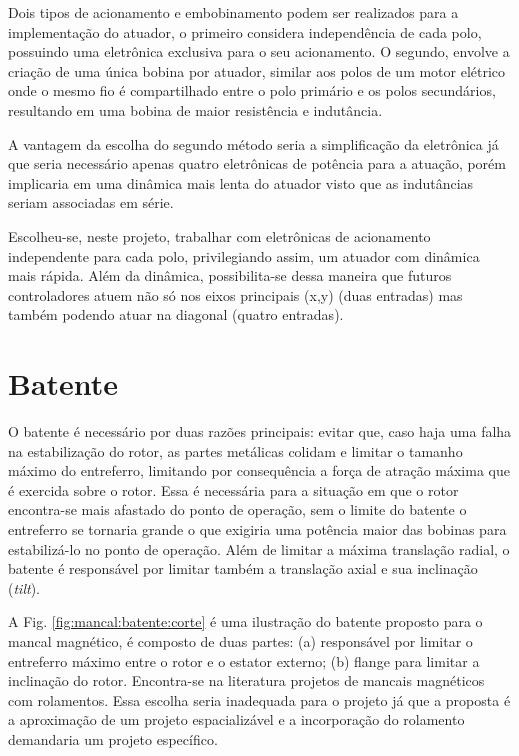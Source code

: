 Dois tipos de acionamento e embobinamento podem ser realizados para a implementação do atuador, o primeiro considera independência de cada polo, possuindo uma eletrônica exclusiva para o seu acionamento. O segundo, envolve a criação de uma única bobina por atuador, similar aos polos de um motor elétrico onde o mesmo fio é compartilhado entre o polo primário e os polos secundários, resultando em uma bobina de maior resistência e indutância. 

A vantagem da escolha do segundo método seria a simplificação da eletrônica já que seria necessário apenas quatro eletrônicas de potência para a atuação, porém implicaria em uma dinâmica mais lenta do atuador visto que as indutâncias seriam associadas em série.

Escolheu-se, neste projeto, trabalhar com eletrônicas de acionamento independente para cada polo, privilegiando assim, um atuador com dinâmica mais rápida. Além da dinâmica, possibilita-se dessa maneira que futuros controladores atuem não só nos eixos principais (x,y) (duas entradas) mas também podendo atuar na diagonal (quatro entradas). 

\section{Batente}

 O batente é necessário por duas razões principais: evitar que, caso haja uma falha na estabilização do rotor, as partes metálicas colidam e limitar o tamanho máximo do entreferro, limitando por consequência a força de atração máxima que é exercida sobre o rotor.  Essa é necessária para a situação em que o rotor encontra-se mais afastado do ponto de operação, sem o limite do batente o entreferro se tornaria grande o que exigiria uma potência maior das bobinas para estabilizá-lo no ponto de operação.  Além de limitar a máxima translação radial, o batente é responsável por limitar também a translação axial e sua inclinação (\textit{tilt}).
 
 A Fig. \ref{fig:mancal:batente:corte} é uma ilustração do batente proposto para o mancal magnético, é composto de duas partes: (a) responsável por limitar o entreferro máximo entre o rotor e o estator externo; (b) flange para limitar a inclinação do rotor. Encontra-se na literatura projetos de mancais magnéticos com rolamentos. Essa escolha seria inadequada para o projeto já que a proposta é a aproximação de um projeto espacializável e a incorporação do rolamento demandaria um projeto específico.
 
